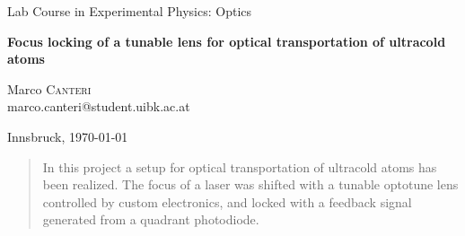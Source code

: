 \documentclass[a4paper,10pt]{article}
\begin{document}
\begin{titlepage}
 \begin{center}
 \Large{Lab Course in Experimental Physics: Optics}
 \end{center}
 \begin{center}
  \LARGE{\textbf{Focus locking of a tunable lens for optical transportation of ultracold atoms}}
 \end{center}
 \begin{center}
 \large Marco \textsc{Canteri} \\
 marco.canteri@student.uibk.ac.at\\
 \end{center}

 \begin{center}
 \vspace{1cm}
 Innsbruck, \today
 \vspace{1cm}
 \end{center}

 \begin{abstract}
In this project a setup for optical transportation of ultracold atoms has been realized. The focus of a laser was shifted with a tunable optotune lens controlled by custom electronics, and locked with a feedback signal generated from a quadrant photodiode.
\end{abstract}
  \vspace{1cm}


\end{titlepage}
\end{document}
